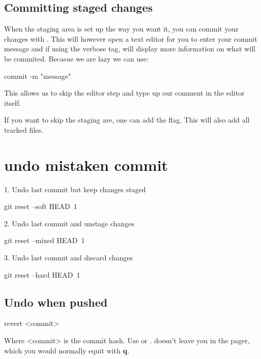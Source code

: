 \subsection{Committing staged changes}
When the staging area is set up the way you want it, you can commit your changes with . This will however open a text editor for you to enter your commit message and if using the  verbose tag, will display more information on what will be commited.\newline
Becasue we are lazy we can use:
\begin{gitBashBox}
commit -m "message"
\end{gitBashBox}
This allows us to skip the editor step and type up our comment in the editor itself.\newline

If you want to skip the staging are, one can add the  flag. This will  also add all tracked files.

\section{undo mistaken commit}
1. Undo last commit but keep changes staged
\begin{gitBashBox}
git reset --soft HEAD~1
\end{gitBashBox}

2. Undo last commit and unstage changes
\begin{gitBashBox}
git reset --mixed HEAD~1
\end{gitBashBox}

3. Undo last commit and discard changes
\begin{gitBashBox}
git reset --hard HEAD~1
\end{gitBashBox}

\subsection{Undo when pushed}
\begin{gitBashBox}
revert <commit>
\end{gitBashBox}
Where <commit> is the commit hash.
Use  or .
 doesn't leave you in the pager, which you would normally equit with \textbf{q}.



